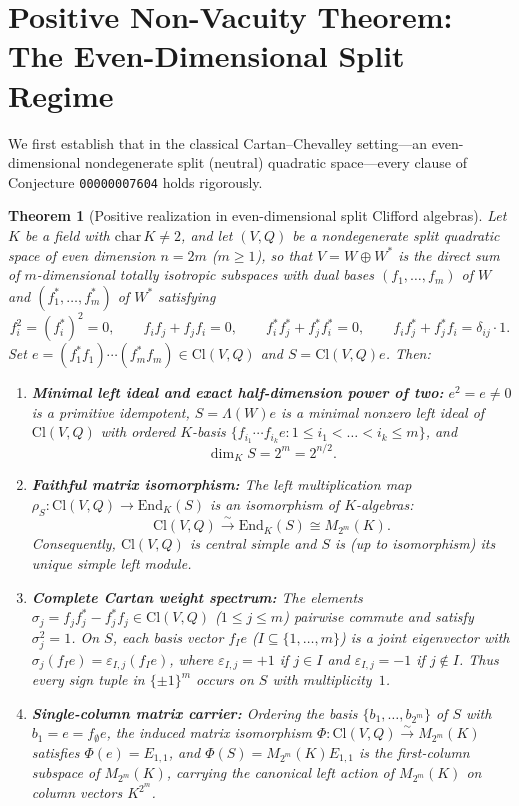 \documentclass[11pt,a4paper]{article}
\theoremstyle{plain}
\newtheorem{theorem}{Theorem}[section]
\theoremstyle{definition}
\theoremstyle{remark}
\newcommand{\Cl}{\mathrm{Cl}}
\newcommand{\End}{\mathrm{End}}
\begin{document}
\section{Positive Non-Vacuity Theorem: The Even-Dimensional Split Regime}

We first establish that in the classical Cartan--Chevalley setting---an even-dimensional nondegenerate split (neutral) quadratic space---every clause of Conjecture \texttt{00000007604} holds rigorously.

\begin{theorem}[Positive realization in even-dimensional split Clifford algebras]\label{thm:positive-split}
Let $K$ be a field with $\mathrm{char}\,K \neq 2$, and let $(V, Q)$ be a nondegenerate split quadratic space of even dimension $n = 2m$ ($m \ge 1$), so that $V = W \oplus W^*$ is the direct sum of $m$-dimensional totally isotropic subspaces with dual bases $(f_1, \dots, f_m)$ of $W$ and $(f_1^*, \dots, f_m^*)$ of $W^*$ satisfying
\[
  f_i^2 = (f_i^*)^2 = 0, \qquad f_i f_j + f_j f_i = 0, \qquad f_i^* f_j^* + f_j^* f_i^* = 0, \qquad f_i f_j^* + f_j^* f_i = \delta_{ij}\cdot 1.
\]
Set $e = (f_1^* f_1)\cdots(f_m^* f_m) \in \Cl(V, Q)$ and $S = \Cl(V, Q) e$. Then:
\begin{enumerate}
  \item \textbf{Minimal left ideal and exact half-dimension power of two:} $e^2 = e \neq 0$ is a primitive idempotent, $S = \Lambda(W) e$ is a minimal nonzero left ideal of $\Cl(V, Q)$ with ordered $K$-basis $\{f_{i_1}\cdots f_{i_k} e : 1 \le i_1 < \dots < i_k \le m\}$, and
  \[
    \dim_K S = 2^m = 2^{n/2}.
  \]
  \item \textbf{Faithful matrix isomorphism:} The left multiplication map $\rho_S : \Cl(V, Q) \to \End_K(S)$ is an isomorphism of $K$-algebras:
  \[
    \Cl(V, Q) \xrightarrow{\;\sim\;} \End_K(S) \cong M_{2^m}(K).
  \]
  Consequently, $\Cl(V, Q)$ is central simple and $S$ is (up to isomorphism) its unique simple left module.
  \item \textbf{Complete Cartan weight spectrum:} The elements $\sigma_j = f_j f_j^* - f_j^* f_j \in \Cl(V, Q)$ ($1 \le j \le m$) pairwise commute and satisfy $\sigma_j^2 = 1$. On $S$, each basis vector $f_I e$ ($I \subseteq \{1,\dots,m\}$) is a joint eigenvector with $\sigma_j (f_I e) = \varepsilon_{I,j} (f_I e)$, where $\varepsilon_{I,j} = +1$ if $j \in I$ and $\varepsilon_{I,j} = -1$ if $j \notin I$. Thus every sign tuple in $\{\pm 1\}^m$ occurs on $S$ with multiplicity~$1$.
  \item \textbf{Single-column matrix carrier:} Ordering the basis $\{b_1, \dots, b_{2^m}\}$ of $S$ with $b_1 = e = f_\emptyset e$, the induced matrix isomorphism $\Phi : \Cl(V, Q) \xrightarrow{\sim} M_{2^m}(K)$ satisfies $\Phi(e) = E_{1,1}$, and $\Phi(S) = M_{2^m}(K) E_{1,1}$ is the first-column subspace of $M_{2^m}(K)$, carrying the canonical left action of $M_{2^m}(K)$ on column vectors $K^{2^m}$.
\end{enumerate}
\end{theorem}
\end{document}
